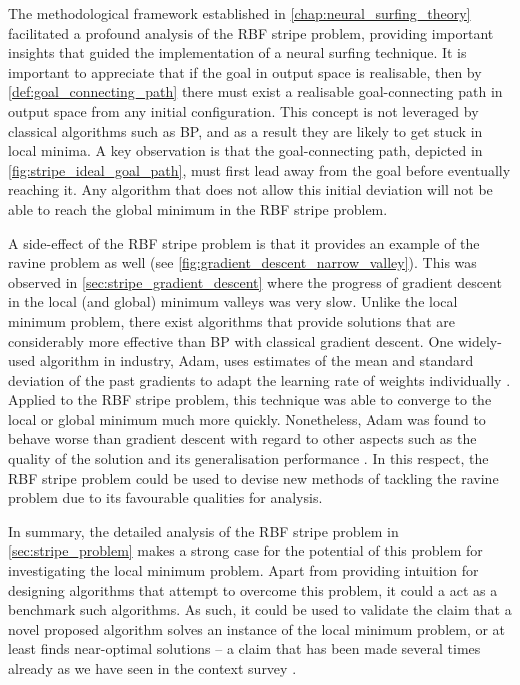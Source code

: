 The methodological framework established in \ref{chap:neural_surfing_theory} facilitated a profound analysis of the RBF stripe problem, providing important insights that guided the implementation of a neural surfing technique.
It is important to appreciate that if the goal in output space is realisable, then by \ref{def:goal_connecting_path} there must exist a realisable goal-connecting path in output space from any initial configuration. 
This concept is not leveraged by classical algorithms such as BP, and as a result they are likely to get stuck in local minima.
A key observation is that the goal-connecting path, depicted in \ref{fig:stripe_ideal_goal_path}, must first lead away from the goal before eventually reaching it.
Any algorithm that does not allow this initial deviation will not be able to reach the global minimum in the RBF stripe problem.

A side-effect of the RBF stripe problem is that it provides an example of the ravine problem as well (see \ref{fig:gradient_descent_narrow_valley}).
This was observed in \ref{sec:stripe_gradient_descent} where the progress of gradient descent in the local (and global) minimum valleys was very slow.
Unlike the local minimum problem, there exist algorithms that provide solutions that are considerably more effective than BP with classical gradient descent.
One widely-used algorithm in industry, Adam, uses estimates of the mean and standard deviation of the past gradients to adapt the learning rate of weights individually \cite{kingma2014}.
Applied to the RBF stripe problem, this technique was able to converge to the local or global minimum much more quickly.
Nonetheless, Adam was found to behave worse than gradient descent with regard to other aspects such as the quality of the solution and its generalisation performance \cite{shirish2017}.
In this respect, the RBF stripe problem could be used to devise new methods of tackling the ravine problem due to its favourable qualities for analysis.

In summary, the detailed analysis of the RBF stripe problem in \ref{sec:stripe_problem} makes a strong case for the potential of this problem for investigating the local minimum problem.
Apart from providing intuition for designing algorithms that attempt to overcome this problem, it could a act as a benchmark such algorithms.
As such, it could be used to validate the claim that a novel proposed algorithm solves an instance of the local minimum problem, or at least finds near-optimal solutions -- a claim that has been made several times already as we have seen in the context survey \cite{kawaguchi2016,choi2008,hirasawa1998,lo2012,lo2017}.

